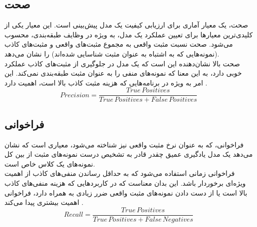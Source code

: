 


\subsection{صحت}
صحت، یک معیار آماری برای ارزیابی کیفیت یک مدل پیش‌بینی است. این معیار یکی از کلیدی‌ترین معیارها برای تعیین عملکرد یک مدل، به ویژه در وظایف طبقه‌بندی، محسوب می‌شود. صحت نسبت مثبت واقعی به مجموع مثبت‌های واقعی و مثبت‌های کاذب (نمونه‌هایی که به اشتباه به عنوان مثبت شناسایی شده‌اند) را نشان می‌دهد.
\\
صحت بالا نشان‌دهنده این است که یک مدل در جلوگیری از مثبت‌های کاذب عملکرد خوبی دارد، به این معنا که نمونه‌های منفی را به عنوان مثبت طبقه‌بندی نمی‌کند. این امر به ویژه در برنامه‌هایی که هزینه مثبت کاذب بالا است، اهمیت دارد \cite{Precisio82:online}. 
\begin{equation}
    Precision = \frac{True \, Positives}{True \, Positives + False \, Positives} 
\end{equation}

\subsection{فراخوانی}
فراخوانی، که به عنوان نرخ مثبت واقعی نیز شناخته می‌شود، معیاری است که نشان می‌دهد یک مدل یادگیری عمیق چقدر قادر به تشخیص درست نمونه‌های مثبت از بین کل نمونه‌های یک کلاس خاص است.
\\
فراخوانی زمانی استفاده می‌شود که به حداقل رساندن منفی‌های کاذب از اهمیت ویژه‌ای برخوردار باشد. این بدان معناست که در کاربردهایی که هزینه منفی‌های کاذب بالا است یا از دست دادن نمونه‌های مثبت واقعی ضرر زیادی به همراه دارد، فراخوانی اهمیت بیشتری پیدا می‌کند \cite{Understa37:online}.
\begin{equation}
     Recall = \frac{True \, Positives}{True \, Positives + False \, Negatives} 
\end{equation}


